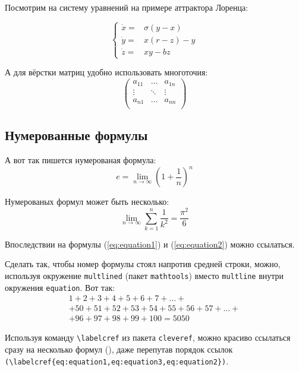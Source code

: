 Посмотрим на систему уравнений на примере аттрактора Лоренца:

\[
\left\{
  \begin{array}{rl}
    \dot x = & \sigma (y-x) \\
    \dot y = & x (r - z) - y \\
    \dot z = & xy - bz
  \end{array}
\right.
\]

А для вёрстки матриц удобно использовать многоточия:
\[
\left(
  \begin{array}{ccc}
    a_{11} & \ldots & a_{1n} \\
    \vdots & \ddots & \vdots \\
    a_{n1} & \ldots & a_{nn} \\
  \end{array}
\right)
\]

\subsection{Нумерованные формулы} \label{subsec:ch1/sec3/sub3}

А вот так пишется нумерованая формула:
\begin{equation}
  \label{eq:equation1}
  e = \lim_{n \to \infty} \left( 1+\frac{1}{n} \right) ^n
\end{equation}

Нумерованых формул может быть несколько:
\begin{equation}
  \label{eq:equation2}
  \lim_{n \to \infty} \sum_{k=1}^n \frac{1}{k^2} = \frac{\pi^2}{6}
\end{equation}

Впоследствии на формулы (\ref{eq:equation1}) и (\ref{eq:equation2}) можно ссылаться.

Сделать так, чтобы номер формулы стоял напротив средней строки, можно,
используя окружение \verb|multlined| (пакет \verb|mathtools|) вместо
\verb|multline| внутри окружения \verb|equation|. Вот так:
\begin{equation} %
  \label{eq:equation3}
    \begin{multlined}
        1+ 2+3+4+5+6+7+\dots + \\
        + 50+51+52+53+54+55+56+57 + \dots + \\
        + 96+97+98+99+100=5050
    \end{multlined}
\end{equation}

Используя команду \verb|\labelcref| из пакета \verb|cleveref|, можно
красиво ссылаться сразу на несколько формул
(), даже перепутав
порядок ссылок \verb|(\labelcref{eq:equation1,eq:equation3,eq:equation2})|.
